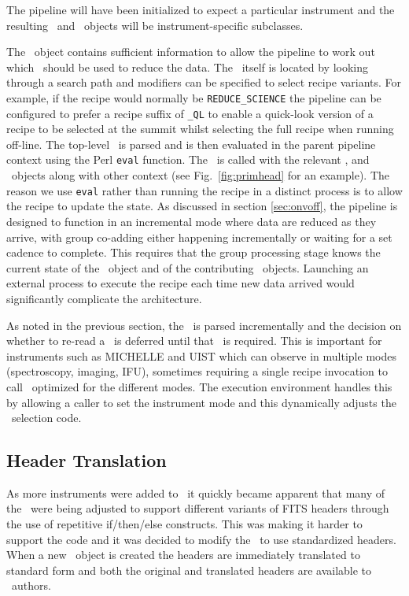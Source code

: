 \documentclass[final,authoryear,5p,times,twocolumn]{elsarticle}
\begin{document}
The pipeline will have been initialized to expect a particular instrument and
the resulting \Frame\ and \Group\ objects will be instrument-specific subclasses.

The \Frame\ object contains sufficient information to allow the
pipeline to work out which \recipe\ should be used to reduce the
data. The \recipe\ itself is located by looking through a search path
and modifiers can be specified to select recipe variants. For example,
if the recipe would normally be \texttt{REDUCE\_SCIENCE} the pipeline
can be configured to prefer a recipe suffix of \texttt{\_QL} to
enable a quick-look version of a recipe to be selected at the summit
whilst selecting the full recipe when running off-line.
The top-level \recipe\ is parsed and is then evaluated in the
parent pipeline context using the Perl \texttt{eval} function. The
\recipe\ is called with the relevant \Frame, and \Group\ objects along
with other context (see Fig.\ \ref{fig:primhead} for an example). The
reason we use \texttt{eval} rather than running the recipe in a
distinct process is to allow the recipe to update the state. As
discussed in section \ref{sec:onvoff}, the pipeline is designed to
function in an incremental mode where data are reduced as they arrive,
with group co-adding either happening incrementally or waiting for a
set cadence to complete. This requires that the group processing stage
knows the current state of the \Group\ object and of the contributing
\Frame\ objects. Launching an external process to execute the
recipe each time new data arrived would significantly complicate the
architecture.

As noted in the previous section, the \recipe\ is parsed incrementally
and the decision on whether to re-read a \primitive\ is deferred until
that \primitive\ is required. This is important for instruments such
as MICHELLE and UIST which can observe in multiple modes
(spectroscopy, imaging, IFU), sometimes
requiring a single recipe invocation to call \primitives\ optimized
for the different modes. The execution environment handles this by
allowing a caller to set the instrument mode and this dynamically
adjusts the \primitive\ selection code.

\subsection{Header Translation}

As more instruments were added to \oracdr\ it quickly became apparent
that many of the \primitives\ were being adjusted to support different
variants of FITS headers through the use of repetitive if/then/else
constructs. This was making it harder to support the code and it was
decided to modify the \primitives\ to use standardized headers. When a
new \Frame\ object is created the headers are immediately translated
to standard form and both the original and translated headers are
available to \primitive\ authors.
\end{document}
